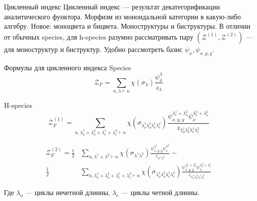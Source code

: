 \documentclass{beamer}
\begin{document}
\begin{frame}{Цикленный индекс}
Цикленный индекс --- результат декатегорификации аналитического функтора.
Морфизм из моноидальной категории в какую-либо алгебру. Новое: моноцвета и
бицвета. Моноструктуры и биструктуры. В отличии от обычных species, для
h-species разумно рассматривать пару $(\mathcal Z^{(1)}, \mathcal Z^{(2)})$ ---
для моноструктур и биструктур. Удобно рассмотреть базис $\psi_{x}, \psi_{x, y,
y}$.
\end{frame}

\begin{frame}{Формулы для цикленного индекса}
Species
$$
\mathcal Z_F = 
\sum_{n, \lambda \vdash n}\chi(\sigma_{\lambda})
\frac{\psi_{x}^{\lambda}}{z_{\lambda}}
$$

H-species
\begin{equation}
\label{eq:h-fr2}
\mathcal Z_F^{(1)} = 
\sum_{n, \lambda_o^1 + \lambda_o^2 + \lambda_e^1 + \lambda_e^2 \vdash
n}\chi(\sigma_{\lambda_o^1 \lambda_o^2 \lambda_e^1 \lambda_e^2})
\frac{\psi_{x, y, y}^{\lambda_e^1 + \lambda_o^2} \psi_{x}^{\lambda_e^2 + 
\lambda_o^1}}{z_{\lambda_o^1 \lambda_o^2 \lambda_e^1 \lambda_e^2}}
\end{equation}

\begin{equation}
\begin{split}
\mathcal Z_F^{(2)} = 
\frac{1}{2}&
\sum_{n, \lambda^1 + \lambda^2 \vdash n}\chi(\sigma_{\lambda^1 \lambda^2})
\frac{\psi_{x, y, y}^{\lambda^1} \psi_{x}^{\lambda^2}}{z_{\lambda^1 \lambda^2}}
- \\
\frac{1}{2}&
\sum_{n, \lambda_o^1 + \lambda_o^2 + \lambda_e^1 + \lambda_e^2 \vdash
n}\chi(\sigma_{\lambda_o^1 \lambda_o^2 \lambda_e^1 \lambda_e^2})
\frac{\psi_{x, y, y}^{\lambda_e^1 + \lambda_o^2} \psi_{x}^{\lambda_e^2 + 
\lambda_o^1}}{z_{\lambda_o^1 \lambda_o^2 \lambda_e^1 \lambda_e^2}}
\end{split}
\end{equation}

Где $\lambda_o$ --- циклы нечетной длинны, $\lambda_e$ ---
циклы четной длинны.
\end{frame}
\end{document}
